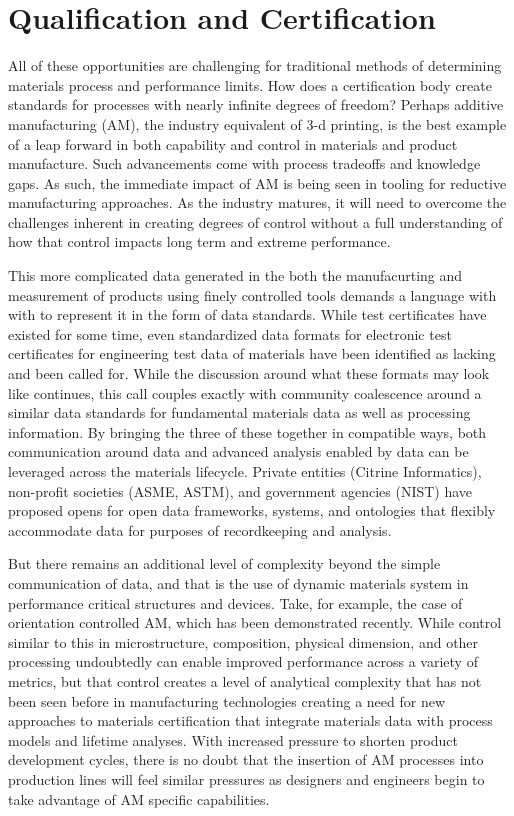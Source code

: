 \section{Qualification and Certification}
All of these opportunities are challenging for traditional methods of determining materials process and performance limits. How does a certification body create standards for processes with nearly infinite degrees of freedom? Perhaps additive manufacturing (AM), the industry equivalent of 3-d printing, is the best example of a leap forward in both capability and control in materials and product manufacture. Such advancements come with process tradeoffs and knowledge gaps\cite{Huang2015}. As such, the immediate impact of AM is being seen in tooling for reductive manufacturing approaches. As the industry matures, it will need to overcome the challenges inherent in creating degrees of control without a full understanding of how that control impacts long term and extreme performance\cite{Bikas2015}.

This more complicated data generated in the both the manufacurting and measurement of products using finely controlled tools demands a language with with to represent it in the form of data standards. While test certificates have existed for some time, even standardized data formats for electronic test certificates for engineering test data of materials have been identified as lacking and been called for\cite{Gagliardi2015357}. While the discussion around what these formats may look like continues, this call couples exactly with community coalescence around a similar data standards for fundamental materials data as well as processing information. By bringing the three of these together in compatible ways, both communication around data and advanced analysis enabled by data can be leveraged across the materials lifecycle. Private entities (Citrine Informatics), non-profit societies (ASME, ASTM), and government agencies (NIST) have proposed opens for open data frameworks, systems, and ontologies that flexibly accommodate data for purposes of recordkeeping and analysis\cite{CitrineInformatics,TheMineralsMetals&MaterialsSocietyTMS2015}. 

But there remains an additional level of complexity beyond the simple communication of data, and that is the use of dynamic materials system in performance critical structures and devices. Take, for example, the case of orientation controlled AM, which has been demonstrated recently\cite{DeHoff2015}. While control similar to this in microstructure, composition, physical dimension, and other processing undoubtedly can enable improved performance across a variety of metrics, but that control creates a level of analytical complexity that has not been seen before in manufacturing technologies creating a need for new approaches to materials certification that integrate materials data with process models and lifetime analyses. With increased pressure to shorten product development cycles, there is no doubt that the insertion of AM processes into production lines will feel similar pressures as designers and engineers begin to take advantage of AM specific capabilities\cite{Tyagi2015202}.
